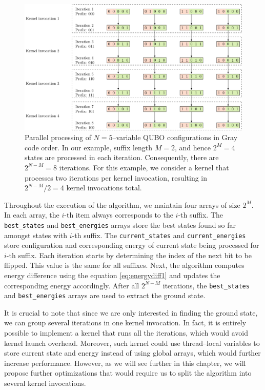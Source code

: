 \begin{figure}
  \includegraphics[width=\textwidth]{figures/grayparallel}
  \caption{
    Parallel processing of $N=5$--variable QUBO configurations in Gray code order. In
    our example, suffix length $M=2$, and hence $2^{M}=4$ states are processed in
    each iteration. Consequently, there are $2^{N-M}=8$ iterations. For this
    example, we consider a kernel that processes two iterations per kernel
    invocation, resulting in $2^{N-M}/2 = 4$ kernel invocations total. }
  \label{fig:grayparallel}
\end{figure}

Throughout the execution of the algorithm, we maintain four arrays of size
$2^{M}$. In each array, the $i$-th item always corresponds to the $i$-th
suffix. The \texttt{best\_states} and \texttt{best\_energies} arrays store the
best states found so far amongst states with $i$-th suffix. The
\texttt{current\_states} and \texttt{current\_energies} store configuration and
corresponding energy of current state being processed for $i$-th suffix. Each
iteration starts by determining the index of the next bit to be flipped. This
value is the same for all suffixes. Next, the algorithm computes energy
difference using the equation \ref{eq:energydiff1} and updates the
corresponding energy accordingly. After all $2^{N-M}$ iterations, the
\texttt{best\_states} and \texttt{best\_energies} arrays are used to extract
the ground state.

It is crucial to note that since we are only interested in finding the ground
state, we can group several iterations in one kernel invocation. In fact, it is
entirely possible to implement a kernel that runs all the iterations, which
would avoid kernel launch overhead. Moreover, such kernel could use
thread--local variables to store current state and energy instead of using
global arrays, which would further increase performance. However, as we will
see further in this chapter, we will propose further optimizations that would
require us to split the algorithm into several kernel invocations.

